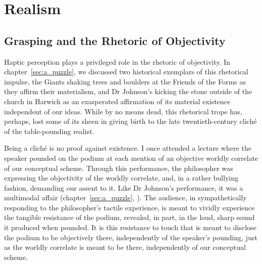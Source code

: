 \chapter{Realism} %
\label{cha:realism}

\section{Grasping and the Rhetoric of Objectivity} %
\label{sec:grasping_and_the_rhetoric_of_objectivity}

Haptic perception plays a privileged role in the rhetoric of objectivity. In chapter~\ref{sec:a_puzzle}, we discussed two historical exemplars of this rhetorical impulse, the Giants shaking trees and boulders at the Friends of the Forms as they affirm their materialism, and Dr Johnson's kicking the stone outside of the church in Harwich as an exasperated affirmation of its material existence independent of our ideas. While by no means dead, this rhetorical trope has, perhaps, lost some of its sheen in giving birth to the late twentieth-century clich\'{e} of the table-pounding realist.

Being a clich\'{e} is no proof against existence. I once attended a lecture where the speaker pounded on the podium at each mention of an objective worldly correlate of our conceptual scheme. Through this performance, the philosopher was expressing the objectivity of the worldly correlate, and, in a rather bullying fashion, demanding our assent to it. Like Dr Johnson's performance, it was a multimodal affair (chapter~\ref{sec:a_puzzle}, \citealt[71]{Campbell:2014aa}). The audience, in sympathetically responding to the philosopher's tactile experience, is meant to vividly experience the tangible resistance of the podium, revealed, in part, in the loud, sharp sound it produced when pounded. It is this resistance to touch that is meant to disclose the podium to be objectively there, independently of the speaker's pounding, just as the worldly correlate is meant to be there, independently of our conceptual scheme.

